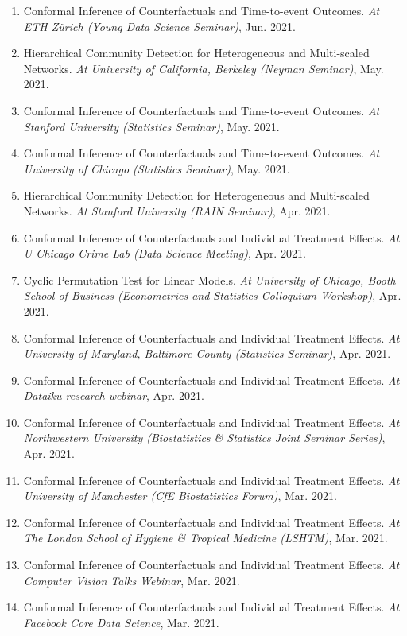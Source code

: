 \documentclass{article}
\begin{document}
\begin{enumerate}
\item Conformal Inference of Counterfactuals and Time-to-event Outcomes. \emph{At ETH Z\"{u}rich (Young Data Science Seminar)}, Jun. 2021.
\item Hierarchical Community Detection for Heterogeneous and Multi-scaled Networks. \emph{At University of California, Berkeley (Neyman Seminar)}, May. 2021.
\item Conformal Inference of Counterfactuals and Time-to-event Outcomes. \emph{At Stanford University (Statistics Seminar)}, May. 2021.
\item Conformal Inference of Counterfactuals and Time-to-event Outcomes. \emph{At University of Chicago (Statistics Seminar)}, May. 2021.
\item Hierarchical Community Detection for Heterogeneous and Multi-scaled Networks. \emph{At Stanford University (RAIN Seminar)}, Apr. 2021.
\item Conformal Inference of Counterfactuals and Individual Treatment Effects. \emph{At U Chicago Crime Lab (Data Science Meeting)}, Apr. 2021.
\item Cyclic Permutation Test for Linear Models. \emph{At University of Chicago, Booth School of Business (Econometrics and Statistics Colloquium Workshop)}, Apr. 2021.
\item Conformal Inference of Counterfactuals and Individual Treatment Effects. \emph{At University of Maryland, Baltimore County (Statistics Seminar)}, Apr. 2021.
\item Conformal Inference of Counterfactuals and Individual Treatment Effects. \emph{At Dataiku research webinar}, Apr. 2021.
\item Conformal Inference of Counterfactuals and Individual Treatment Effects. \emph{At Northwestern University (Biostatistics \& Statistics Joint Seminar Series)}, Apr. 2021.
\item Conformal Inference of Counterfactuals and Individual Treatment Effects. \emph{At University of Manchester (CfE Biostatistics Forum)}, Mar. 2021.
\item Conformal Inference of Counterfactuals and Individual Treatment Effects. \emph{At The London School of Hygiene \& Tropical Medicine (LSHTM)}, Mar. 2021.
\item Conformal Inference of Counterfactuals and Individual Treatment Effects. \emph{At Computer Vision Talks Webinar}, Mar. 2021.
\item Conformal Inference of Counterfactuals and Individual Treatment Effects. \emph{At Facebook Core Data Science}, Mar. 2021.

\end{enumerate}
\end{document}

